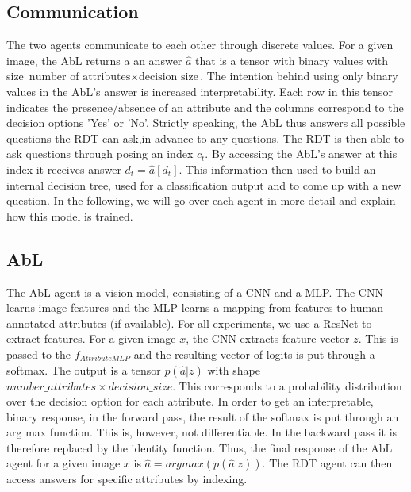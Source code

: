 \documentclass[a4paper,cleardoubleempty,BCOR1cm, 11pt]{report}
\begin{document}
\subsection{Communication}
The two agents communicate to each other through discrete values. For a given image, the AbL returns a an answer $\hat{a}$ that is a tensor with binary values with size $\text{number of attributes} \times \text{decision size}$. The intention behind using only binary values in the AbL's answer is increased interpretability. Each row in this tensor indicates the presence/absence of an attribute and the columns correspond to the decision options 'Yes' or 'No'. Strictly speaking, the AbL thus answers all possible questions the RDT can ask,in advance to any questions. 
The RDT is then able to ask questions through posing an index $c_t$. By accessing the AbL's answer at this index it receives answer $d_t = \hat{a}[d_t]$. This information then used to build an internal decision tree, used for a classification output and to come up with a new question. In the following, we will go over each agent in more detail and explain how this model is trained.


\subsection{AbL}
The AbL agent is a vision model, consisting of a CNN and a MLP. The CNN learns image features and the MLP learns a mapping from features to human-annotated attributes (if available). For all experiments, we use a ResNet \cite{he2016deep} to extract features. For a given image $x$, the CNN extracts feature vector $z$. This is passed to the $f_{AttributeMLP}$ and the resulting vector of logits is put through a softmax. The output is a tensor $p(\hat{a}|z)$ with shape $number\_attributes \times decision\_size$. This corresponds to a probability distribution over the decision option for each attribute. In order to get an interpretable, binary response, in the forward pass, the result of the softmax is put through an arg max function. This is, however, not differentiable. In the backward pass it is therefore replaced by the identity function. Thus, the final response of the AbL agent for a given image $x$ is $\hat{a} = argmax(p(\hat{a}|z))$. The RDT agent can then access answers for specific attributes by indexing.
\end{document}
